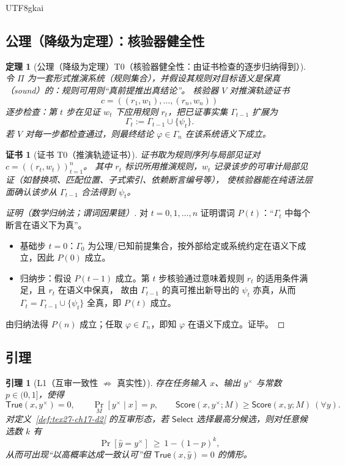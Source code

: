 \documentclass[12pt]{article}
\newtheorem{theorem}{定理}[section]
\newtheorem{lemma}{引理}[section]
\newtheorem{Certificate}{证书}[section]
\begin{document}
\begin{CJK*}{UTF8}{gkai}
\subsection{公理（降级为定理）：核验器健全性}
\label{subsec:tex27-ch17-axiom-as-theorem}

\begin{theorem}[公理（降级为定理）T0（核验器健全性：由证书检查的逐步归纳得到）]
\label{thm:tex27-ch17-t0}
令 $\Pi$ 为一套形式推演系统（规则集合），并假设其规则对目标语义是保真（sound）的：规则可用则“真前提推出真结论”。
核验器 $V$ 对推演轨迹证书
\[
  c=((r_1,w_1),\dots,(r_n,w_n))
\]
逐步检查：第 $t$ 步在见证 $w_t$ 下应用规则 $r_t$，把已证事实集 $\Gamma_{t-1}$ 扩展为
\[
  \Gamma_t := \Gamma_{t-1}\cup\{\psi_t\}.
\]
若 $V$ 对每一步都检查通过，则最终结论 $\varphi\in\Gamma_n$ 在该系统语义下成立。
\end{theorem}

\begin{Certificate}[证书 T0（推演轨迹证书）]
\label{cert:tex27-ch17-t0}
证书取为规则序列与局部见证对 $c=((r_t,w_t))_{t=1}^{n}$。
其中 $r_t$ 标识所用推演规则，$w_t$ 记录该步的可审计局部见证（如替换项、匹配位置、子式索引、依赖断言编号等），
使核验器能在纯语法层面确认该步从 $\Gamma_{t-1}$ 合法得到 $\psi_t$。
\end{Certificate}

\begin{proof}[证明（数学归纳法；谓词因果链）]
对 $t=0,1,\dots,n$ 证明谓词 $P(t)$：“$\Gamma_t$ 中每个断言在语义下为真”。
\begin{itemize}
  \item 基础步 $t=0$：$\Gamma_0$ 为公理/已知前提集合，按外部给定或系统约定在语义下成立，因此 $P(0)$ 成立。
  \item 归纳步：假设 $P(t-1)$ 成立。第 $t$ 步核验通过意味着规则 $r_t$ 的适用条件满足，且 $r_t$ 在语义中保真，
  故由 $\Gamma_{t-1}$ 的真可推出新导出的 $\psi_t$ 亦真，从而 $\Gamma_t=\Gamma_{t-1}\cup\{\psi_t\}$ 全真，即 $P(t)$ 成立。
\end{itemize}
由归纳法得 $P(n)$ 成立；任取 $\varphi\in\Gamma_n$，即知 $\varphi$ 在语义下成立。证毕。
\end{proof}

\subsection{引理}
\label{subsec:tex27-ch17-lemmas}

\begin{lemma}[L1（互审一致性 $\not\Rightarrow$ 真实性）]
\label{lem:tex27-ch17-l1}
存在任务输入 $x$、输出 $y^{\times}$ 与常数 $p\in(0,1]$，使得
\[
  \mathsf{True}(x,y^{\times})=0,
  \qquad
  \Pr_{M}[y^{\times}\mid x]=p,
  \qquad
  \mathsf{Score}(x,y^{\times};M)\ge \mathsf{Score}(x,y;M)\ (\forall y).
\]
对定义~\ref{def:tex27-ch17-d2} 的互审形态，若 $\mathsf{Select}$ 选择最高分候选，则对任意候选数 $k$ 有
\[
  \Pr[\hat y=y^{\times}]\ \ge\ 1-(1-p)^k,
\]
从而可出现“以高概率达成一致认可”但 $\mathsf{True}(x,\hat y)=0$ 的情形。
\end{lemma}


\end{CJK*}
\end{document}

